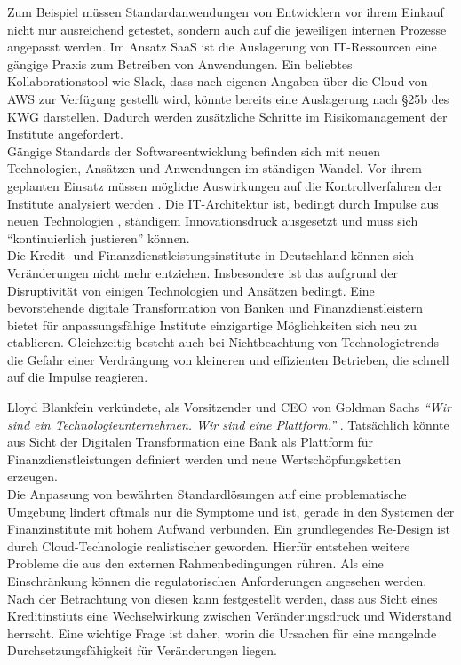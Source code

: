 Zum Beispiel müssen Standardanwendungen von Entwicklern vor ihrem Einkauf nicht nur ausreichend getestet, sondern auch auf die jeweiligen internen Prozesse angepasst werden. Im Ansatz \ac{SaaS} ist die Auslagerung von IT-Ressourcen eine gängige Praxis zum Betreiben von Anwendungen. Ein beliebtes Kollaborationstool wie Slack, dass nach eigenen Angaben über die Cloud von \ac{AWS} zur Verfügung gestellt wird, könnte bereits eine Auslagerung nach §25b des \ac{KWG} darstellen. Dadurch werden zusätzliche Schritte im Risikomanagement der Institute angefordert.
\medskip
\\
Gängige Standards der Softwareentwicklung befinden sich mit neuen Technologien, Ansätzen und Anwendungen im ständigen Wandel. Vor ihrem geplanten Einsatz müssen mögliche Auswirkungen auf die Kontrollverfahren der Institute analysiert werden \cite{MaRisk:2017}.
Die IT-Architektur ist, bedingt durch Impulse aus neuen Technologien \cite{Bussmann2006}, ständigem Innovationsdruck ausgesetzt und muss sich \enquote{kontinuierlich justieren} \cite{Bussmann2006} können. 
\medskip
\\
Die Kredit- und Finanzdienstleistungsinstitute in Deutschland können sich Veränderungen nicht mehr entziehen. Insbesondere ist das aufgrund der Disruptivität von einigen Technologien und Ansätzen bedingt. Eine bevorstehende digitale Transformation von Banken und Finanzdienstleistern bietet für anpassungsfähige Institute einzigartige Möglichkeiten sich neu zu etablieren. Gleichzeitig besteht auch bei Nichtbeachtung von Technologietrends die Gefahr einer Verdrängung von kleineren und effizienten Betrieben, die schnell auf die Impulse reagieren.

Lloyd Blankfein verkündete, als Vorsitzender und \ac{CEO} von Goldman Sachs \emph{\enquote{Wir sind ein Technologieunternehmen. Wir sind eine Plattform.}} \cite{Gupta:2017}. Tatsächlich könnte aus Sicht der Digitalen Transformation eine Bank als Plattform für Finanzdienstleistungen definiert werden und neue Wertschöpfungsketten erzeugen. 
\medskip
\\

Die Anpassung von bewährten Standardlösungen auf eine problematische Umgebung \cite{Bussmann2006, Brockhoff2006, Strietzel2018} lindert oftmals nur die Symptome und ist, gerade in den Systemen der Finanzinstitute mit hohem Aufwand verbunden. Ein grundlegendes Re-Design \cite{Bussmann2006} ist durch Cloud-Technologie realistischer geworden. Hierfür entstehen weitere Probleme die aus den externen Rahmenbedingungen rühren. Als eine Einschränkung können die regulatorischen Anforderungen \cite{MaRisk:2017} angesehen werden. Nach der Betrachtung von diesen kann festgestellt werden, dass aus Sicht eines Kreditinstiuts eine Wechselwirkung zwischen Veränderungsdruck und Widerstand herrscht. Eine wichtige Frage ist daher, worin die Ursachen für eine mangelnde Durchsetzungsfähigkeit für Veränderungen liegen.
%
%
